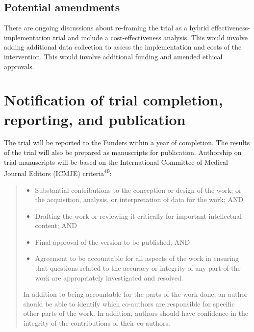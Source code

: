 \documentclass[
]{scrartcl}
\providecommand{\tightlist}{%
  \setlength{\itemsep}{0pt}\setlength{\parskip}{0pt}}\usepackage{longtable,booktabs,array}
\begin{document}
\hypertarget{potential-amendments}{%
\subsection{Potential amendments}\label{potential-amendments}}

There are ongoing discussions about re-framing the trial as a hybrid
effectiveness-implementation trial and include a cost-effectiveness
analysis. This would involve adding additional data collection to assess
the implementation and costs of the intervention. This would involve
additional funding and amended ethical approvals.

\hypertarget{notification-of-trial-completion-reporting-and-publication}{%
\section{Notification of trial completion, reporting, and
publication}\label{notification-of-trial-completion-reporting-and-publication}}

The trial will be reported to the Funders within a year of completion.
The results of the trial will also be prepared as manuscripts for
publication. Authorship on trial manuscripts will be based on the
International Committee of Medical Journal Editors (ICMJE)
criteria\textsuperscript{49}:

\begin{quote}
\begin{itemize}
\tightlist
\item
  Substantial contributions to the conception or design of the work; or
  the acquisition, analysis, or interpretation of data for the work; AND
\item
  Drafting the work or reviewing it critically for important
  intellectual content; AND
\item
  Final approval of the version to be published; AND
\item
  Agreement to be accountable for all aspects of the work in ensuring
  that questions related to the accuracy or integrity of any part of the
  work are appropriately investigated and resolved.
\end{itemize}

In addition to being accountable for the parts of the work done, an
author should be able to identify which co-authors are responsible for
specific other parts of the work. In addition, authors should have
confidence in the integrity of the contributions of their co-authors.
\end{quote}
\end{document}
